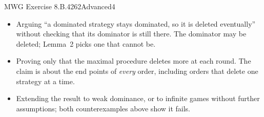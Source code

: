 \begin{exsol}{MWG Exercise 8.B.4}{262}{Advanced}{4}
\mistakes
\begin{itemize}
  \item Arguing ``a dominated strategy stays dominated, so it is deleted eventually'' without
  checking that its dominator is still there. The dominator may be deleted; Lemma~2 picks one that
  cannot be.
  \item Proving only that the maximal procedure deletes more at each round. The claim is about
  the end points of \emph{every} order, including orders that delete one strategy at a time.
  \item Extending the result to weak dominance, or to infinite games without further
  assumptions; both counterexamples above show it fails.
\end{itemize}

\end{exsol}
